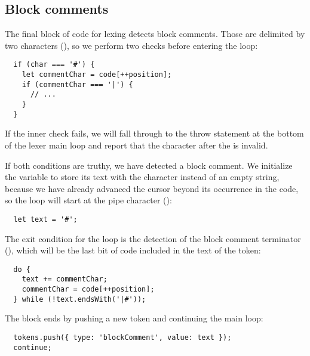 \subsection{Block comments}
The final block of code for lexing detects block comments.
Those are delimited by two characters (),
so we perform two checks before entering the loop:
\begin{verbatim}
  if (char === '#') {
    let commentChar = code[++position];
    if (commentChar === '|') {
      // ...
    }
  }
\end{verbatim}
If the inner check fails, we will fall through to the throw statement
at the bottom of the lexer main loop and report that
the character after the \code{#} is invalid.

If both conditions are truthy, we have detected a block comment.
We initialize the variable to store its text
with the character \code{#} instead of an empty string,
because we have already advanced the cursor beyond its occurrence in the code,
so the loop will start at the pipe character (\code{|}):
\begin{verbatim}
  let text = '#';
\end{verbatim}

The exit condition for the loop is the detection
of the block comment terminator (\code{|#}),
which will be the last bit of code included in the text of the token:
\begin{verbatim}
  do {
    text += commentChar;
    commentChar = code[++position];
  } while (!text.endsWith('|#'));
\end{verbatim}

The block ends by pushing a new token and continuing the main loop:
\begin{verbatim}
  tokens.push({ type: 'blockComment', value: text });
  continue;
\end{verbatim}
